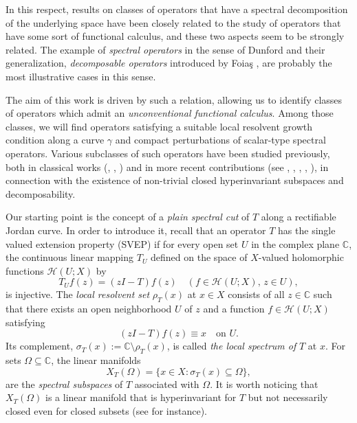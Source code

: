 \documentclass[11pt]{amsart}
\theoremstyle{definition}
\theoremstyle{remark}
\numberwithin{equation}{section}
\begin{document}
	
	\smallskip
	
	In this respect, results on classes of operators that have a spectral decomposition of the underlying space have been closely related to the study of operators that have some sort of functional calculus, and these two aspects seem to be strongly related. The example of \emph{spectral operators} in the sense of Dunford \cite{Dunford and Schwarz} and
	their generalization, \emph{decomposable operators} introduced by Foia\c{s} \cite{FOIAS}, are probably the most illustrative cases in this sense.
	
	\smallskip
	
	The aim of this work is driven by such a relation, allowing us to identify classes of operators which admit an \emph{unconventional functional calculus}. Among those classes, we will find operators satisfying a suitable local resolvent growth condition along a curve $\gamma$  and compact perturbations of scalar-type spectral operators.
Various subclasses of such operators have been studied previously, both in classical works (\cite{LjubicMacaev1965}, \cite{Apostol1971}, \cite{Kitano1973}) and in more recent contributions (see \cite{Chalendar1996, Chalendar1997, Chalendar1998}, \cite{FX12}, \cite{AA}, \cite{PutinarYakubovich2021}, \cite{GG2, GG3}), in connection with the existence of non-trivial closed hyperinvariant subspaces and decomposability.

	\smallskip

Our starting point is the concept of a \emph{plain spectral cut} of $T$ along a rectifiable Jordan curve. In order to introduce it, recall that an operator $T$ has the single valued extension property (SVEP) if for every open set $U$ in the complex plane $\mathbb{C}$, the continuous linear mapping $T_U $ defined on the space of $X$-valued holomorphic functions $\mathcal{H}(U; X)$ by
	$$
	T_U f(z)= (zI - T) f(z) \quad  (f \in \mathcal{H}(U; X), \, z \in U),
	$$
	is injective. The \emph{local resolvent set} $\rho_T(x)$ at $x\in X$ consists  of all $z \in \mathbb{C}$ such that there exists an open neighborhood $U$ of $z$ and a function $f \in \mathcal{H}(U; X) $ satisfying
	$$
	(zI - T) f(z) \equiv x \quad \text{on } U.
	$$
	Its complement, $ \sigma_T(x) := \mathbb{C} \setminus \rho_T(x) $, is called \emph{the local spectrum of} $ T $ at $ x $. For sets $ \Omega \subseteq   \mathbb{C}$, the linear manifolds
	$$
	X_T(\Omega)= \{ x \in X : \sigma_T(x) \subseteq   \Omega \},
	$$
	are the \emph{spectral subspaces} of $T$ associated with $\Omega$. It is worth noticing that $X_T(\Omega)$ is a linear manifold that is hyperinvariant for $T$ but not necessarily closed even for closed subsets (see \cite[Chapter 2]{AIENA-book} for instance).
\end{document}
